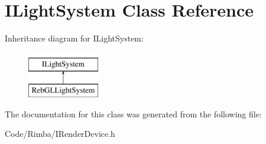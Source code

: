 \hypertarget{class_i_light_system}{}\section{I\+Light\+System Class Reference}
\label{class_i_light_system}
Inheritance diagram for I\+Light\+System\+:\begin{figure}[H]
\begin{center}
\leavevmode
\includegraphics[height=2.000000cm]{class_i_light_system}
\end{center}
\end{figure}


The documentation for this class was generated from the following file\+:\begin{DoxyCompactItemize}
\item 
Code/\+Rimba/I\+Render\+Device.\+h\end{DoxyCompactItemize}
